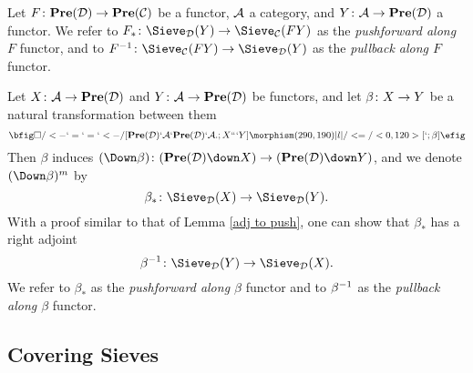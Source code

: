 \documentclass[10pt]{amsart}
\begin{document}
\begin{definition}

Let $F\colon{\bf Pre}(\mathcal{D})\rightarrow{\bf Pre}(\mathcal{C})$ be a functor, $\mathcal{A}$ a category, and $Y\colon\mathcal{A}\rightarrow{\bf Pre}(\mathcal{D})$ a functor.  We refer to $F_*\taking\Sieve_\mcD(Y)\to\Sieve_\mcC(FY)$ as the {\em pushforward along $F$} functor, and to $F^\m1\taking\Sieve_\mcC(FY)\to\Sieve_\mcD(Y)$ as the {\em pullback along $F$} functor.

\end{definition}

Let $X\colon\mathcal{A}\rightarrow{\bf Pre}(\mathcal{D})$ and $Y\colon\mathcal{A}\rightarrow{\bf Pre}(\mathcal{D})$ be functors, and let $\beta\colon X\rightarrow Y$ be a natural transformation between them $$\bfig
\square/<-`=`=`<-/[\Pre(\mcD)`\mcA`\Pre(\mcD)`\mcA.;X```Y] \morphism(290,190)|l|/<=/<0,120>[`;\beta] \efig$$  Then $\beta$ induces $(\Down\beta)\taking(\Pre(\mcD)\down X)\to(\Pre(\mcD)\down Y)$, and we denote $(\Down\beta)^m$ by $$\beta_*\taking\Sieve_\mcD(X)\to\Sieve_\mcD(Y).$$  With a proof similar to that of Lemma \ref{adj to push}, one can show that $\beta_*$ has a right adjoint $$\beta^\m1\taking\Sieve_\mcD(Y)\to\Sieve_\mcD(X).$$  We refer to $\beta_*$ as the {\em pushforward along $\beta$} functor and to $\beta^\m1$ as the {\em pullback along $\beta$} functor.




\subsection{Covering Sieves}
\end{document}
